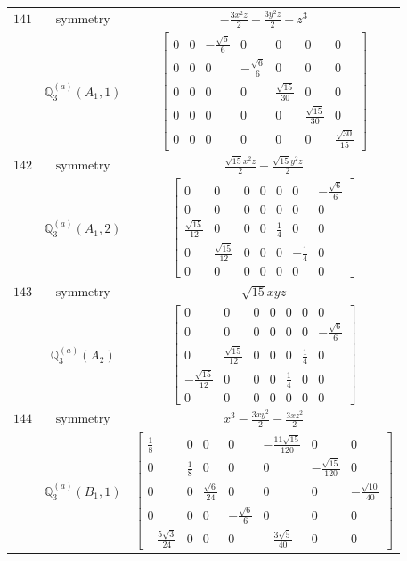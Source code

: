 \documentclass[fleqn,8pt,landscape]{jsarticle}
\begin{document}
\begin{longtable}{ccc}
$ 141 $ & $ \text{symmetry} $ & $ - \frac{3 x^{2} z}{2} - \frac{3 y^{2} z}{2} + z^{3} $ \\
$  $ & $ \mathbb{Q}_{3}^{(a)}(A_{1},1) $ & $ \begin{bmatrix} 0 & 0 & - \frac{\sqrt{6}}{6} & 0 & 0 & 0 & 0 \\ 0 & 0 & 0 & - \frac{\sqrt{6}}{6} & 0 & 0 & 0 \\ 0 & 0 & 0 & 0 & \frac{\sqrt{15}}{30} & 0 & 0 \\ 0 & 0 & 0 & 0 & 0 & \frac{\sqrt{15}}{30} & 0 \\ 0 & 0 & 0 & 0 & 0 & 0 & \frac{\sqrt{30}}{15} \end{bmatrix} $ \\ \hline
$ 142 $ & $ \text{symmetry} $ & $ \frac{\sqrt{15} x^{2} z}{2} - \frac{\sqrt{15} y^{2} z}{2} $ \\
$  $ & $ \mathbb{Q}_{3}^{(a)}(A_{1},2) $ & $ \begin{bmatrix} 0 & 0 & 0 & 0 & 0 & 0 & - \frac{\sqrt{6}}{6} \\ 0 & 0 & 0 & 0 & 0 & 0 & 0 \\ \frac{\sqrt{15}}{12} & 0 & 0 & 0 & \frac{1}{4} & 0 & 0 \\ 0 & \frac{\sqrt{15}}{12} & 0 & 0 & 0 & - \frac{1}{4} & 0 \\ 0 & 0 & 0 & 0 & 0 & 0 & 0 \end{bmatrix} $ \\ \hline
$ 143 $ & $ \text{symmetry} $ & $ \sqrt{15} x y z $ \\
$  $ & $ \mathbb{Q}_{3}^{(a)}(A_{2}) $ & $ \begin{bmatrix} 0 & 0 & 0 & 0 & 0 & 0 & 0 \\ 0 & 0 & 0 & 0 & 0 & 0 & - \frac{\sqrt{6}}{6} \\ 0 & \frac{\sqrt{15}}{12} & 0 & 0 & 0 & \frac{1}{4} & 0 \\ - \frac{\sqrt{15}}{12} & 0 & 0 & 0 & \frac{1}{4} & 0 & 0 \\ 0 & 0 & 0 & 0 & 0 & 0 & 0 \end{bmatrix} $ \\ \hline
$ 144 $ & $ \text{symmetry} $ & $ x^{3} - \frac{3 x y^{2}}{2} - \frac{3 x z^{2}}{2} $ \\
$  $ & $ \mathbb{Q}_{3}^{(a)}(B_{1},1) $ & $ \begin{bmatrix} \frac{1}{8} & 0 & 0 & 0 & - \frac{11 \sqrt{15}}{120} & 0 & 0 \\ 0 & \frac{1}{8} & 0 & 0 & 0 & - \frac{\sqrt{15}}{120} & 0 \\ 0 & 0 & \frac{\sqrt{6}}{24} & 0 & 0 & 0 & - \frac{\sqrt{10}}{40} \\ 0 & 0 & 0 & - \frac{\sqrt{6}}{6} & 0 & 0 & 0 \\ - \frac{5 \sqrt{3}}{24} & 0 & 0 & 0 & - \frac{3 \sqrt{5}}{40} & 0 & 0 \end{bmatrix} $ \\ \hline

\end{longtable}
\end{document}
